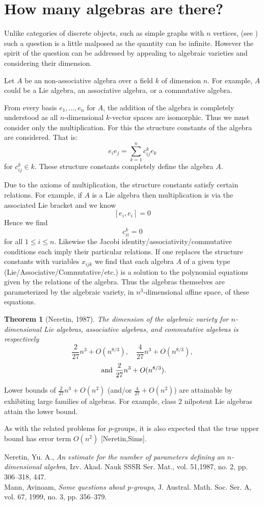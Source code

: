 \documentclass[12pt]{article}
\newtheorem{thm}{Theorem}
\begin{document}
\section{How many algebras are there?}

Unlike categories of discrete objects, such as simple graphs with $n$ vertices, (see ) such a question is a little malposed as the quantity can be infinite.  However the spirit of the question can be addressed by appealing to algebraic varieties and considering their dimension.

Let $A$ be an non-associative algebra over a field $k$ of dimension $n$.  For example, $A$ could be a Lie algebra, an associative algebra, or a commutative algebra.  

From every basis $e_1,\dots, e_n$ for $A$, the addition of the algebra is completely understood as all $n$-dimensional $k$-vector spaces are isomorphic.  Thus we must consider only the multiplication.  For this the structure constants of the algebra are considered.  That is:
\[e_i e_j = \sum_{k=1}^n c^k_{ij} e_k\]
for $c^k_{ij}\in k$.  These structure constants completely define the algebra $A$.

Due to the axioms of multiplication, the structure constants satisfy certain relations.  For example, if $A$ is a Lie algebra then multiplication is via the associated Lie bracket and we know 
\[ [e_i,e_i]=0\]
Hence we find
\[c^k_{ii}=0\]
for all $1\leq i\leq n$.  Likewise the Jacobi identity/associativity/commutative conditions each imply their particular relations.  If one replaces the structure constants with variables $x_{ijk}$ we find that each algebra $A$ of a given type (Lie/Associative/Commutative/etc.) is a solution to the polynomial equations given by the relations of the algebra.  Thus the algebras themselves are parameterized by the algebraic variety, in $n^3$-dimensional affine space, of these equations.

\begin{thm}[Neretin, 1987]
The dimension of the algebraic variety for $n$-dimensional Lie algebras, associative
algebras, and commutative algebras is respectively
 \[\frac{2}{27}n^3 + O(n^{8/3}), \quad \frac{4}{27}n^3 + O(n^{8/3}),\]
 	\[\textnormal{ and }	\frac{2}{27}n^3 + O(n^{8/3}).\]
\end{thm}

Lower bounds of $\frac{2}{27}n^3+O(n^2)$ (and/or $\frac{4}{27}+O(n^2)$) are attainable by exhibiting large families of algebras.  For example, class 2 nilpotent Lie algebras attain the lower bound.  

As with the related problems for $p$-groups, it is also expected that the true upper bound has error term $O(n^2)$ [Neretin,Sims].


Neretin, Yu. A., \emph{An estimate for the number of parameters defining an
              {$n$}-dimensional algebra}, Izv. Akad. Nauk SSSR Ser. Mat., vol. 51,1987, no. 2, pp. 306--318, 447.\\

Mann, Avinoam, \emph{Some questions about {$p$}-groups},
  J. Austral. Math. Soc. Ser. A, vol. 67, 1999, no. 3, pp. 356--379.

\end{document}
